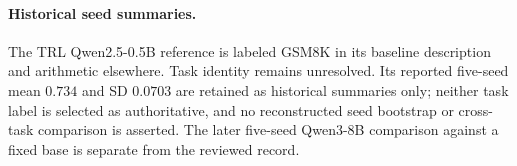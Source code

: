 \paragraph{Historical seed summaries.}
The TRL Qwen2.5-0.5B reference is labeled GSM8K in its baseline description
and arithmetic elsewhere. Task identity remains unresolved. Its reported
five-seed mean $0.734$ and SD $0.0703$ are retained as historical summaries
only; neither task label is selected as authoritative, and no reconstructed
seed bootstrap or cross-task comparison is asserted. The later five-seed
Qwen3-8B comparison against a fixed base is separate from the reviewed record.
